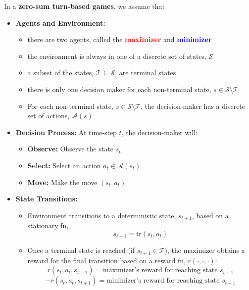 \begin{summary}
    In a \textbf{zero-sum turn-based games}, we assume that 
    \begin{itemize}
        \item \textbf{Agents and Environment:} 
        \begin{itemize}
            \item there are two agents, called the \textcolor{red}{\textbf{maximizer}} and \textcolor{blue}{\textbf{minimizer}}
            \item the environment is always in one of a discrete set of states, $\mathcal{S}$
            \item a subset of the states, $\mathcal{T} \subseteq \mathcal{S}$, are terminal states
            \item there is only one decision maker for each non-terminal state, $s \in \mathcal{S} \setminus \mathcal{T}$
            \item For each non-terminal state, $s \in \mathcal{S} \setminus \mathcal{T}$, the decision-maker has a discrete set of actions, $\mathcal{A}(s)$
        \end{itemize}
        \item \textbf{Decision Process:} At time-step $t$, the decision-maker will: 
        \begin{itemize}
            \item \textbf{Observe:} Observe the state $s_t$ 
            \item \textbf{Select:} Select an action $a_t \in \mathcal{A}(s_t)$
            \item \textbf{Move:} Make the move $(s_t,a_t)$
        \end{itemize}
        \item \textbf{State Transitions:} 
        \begin{itemize}
            \item Environment transitions to a deterministic state, $s_{t+1}$, based on a stationary fn, 
            \begin{equation*}
                s_{t+1} = \text{tr}(s_t,a_t)
            \end{equation*}
            \item Once a terminal state is reached (if $s_{t+1} \in \mathcal{T}$), the maximizer obtains a reward for the final transition based on a reward fn, $r(\cdot,\cdot,\cdot)$:
            \begin{equation*}
                r(s_t,a_t,s_{t+1}) = \text{maximizer's reward for reaching state $s_{t+1}$}
            \end{equation*}
            \begin{equation*}
                - r(s_t,a_t,s_{t+1}) = \text{minimizer's reward for reaching state $s_{t+1}$}
            \end{equation*}
        \end{itemize}
    \end{itemize}
\end{summary}

